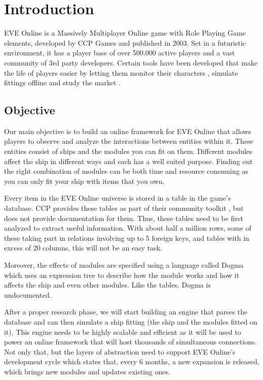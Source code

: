 \chapter{Introduction}
\label{chapter:intro}

EVE Online \cite{eve} is a Massively Multiplayer Online \cite{mmo} game with Role Playing Game \cite{rpg} elements, developed by CCP Games \cite{ccp} and published in 2003. Set in a futuristic environment, it has a player base of over 500,000 active players and a vast community of 3rd party developers. Certain tools have been developed that make the life of players easier by letting them monitor their characters \cite{evemon}, simulate fittings offline \cite{pyfa} and study the market \cite{evecentral}.

\section{Objective}
Our main objective is to build an online framework for EVE Online that allows players to observe and analyze the interactions between entities within it. These entities consist of ships and the modules you can fit on them. Different modules affect the ship in different ways and each has a well suited purpose. Finding out the right combination of modules can be both time and resource consuming as you can only fit your ship with items that you own.

Every item in the EVE Online universe is stored in a table in the game’s database. CCP provides these tables as part of their community toolkit \cite{sde}, but does not provide documentation for them. Thus, these tables need to be first analyzed to extract useful information. With about half a million rows, some of these taking part in relations involving up to 5 foreign keys, and tables with in excess of 20 columns, this will not be an easy task.

Moreover, the effects of modules are specified using a language called Dogma which uses an expression tree to describe how the module works and how it affects the ship and even other modules. Like the tables, Dogma is undocumented.

After a proper research phase, we will start building an engine that parses the database and can then simulate a ship fitting (the ship and the modules fitted on it). This engine needs to be highly scalable and efficient as it will be used to power an online framework that will host thousands of simultaneous connections. Not only that, but the layers of abstraction need to support EVE Online’s development cycle which states that, every 6 months, a new expansion is released, which brings new modules and updates existing ones.

